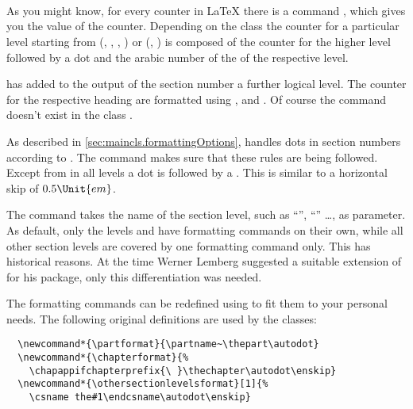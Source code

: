 \begin{Explain}%
\begin{Declaration}
  \\
  \\
  \\
\end{Declaration}%
%
%
%
%
  As you might know, for every counter in {\LaTeX} there is a command
  , which gives you the value of the
  counter. Depending on the class the counter for a particular level
  starting from  (, ,
  , ) or 
  (, ) is composed of the counter for the
  higher level followed by a dot and the arabic number of the
   of the respective level.\par
\end{Explain}

\KOMAScript{} has added to the output of the section number a further
logical level. The counter for the respective heading are formatted
using ,  and
.
Of course the command
 doesn't exist in the class .

As described in \autoref{sec:maincls.formattingOptions},
{\KOMAScript} handles dots in section numbers according to
\cite{DUDEN}. The command  makes sure that these rules
are being followed. Except from  in all levels a dot is
followed by a .  This is similar to a horizontal skip of
\(0.5\Unit{em}\).

The command  takes the name of the
section level, such as ``'', ``''
\dots{}, as parameter. As default, only the levels  and
 have formatting commands on their own, while all other
section levels are covered by one formatting command only. This has
historical reasons. At the time Werner Lemberg suggested a suitable
extension of {\KOMAScript} for his  package, only this
differentiation was needed.

The formatting commands can be redefined using  to
fit them to your personal needs. The following original definitions
are used by the {\KOMAScript} classes:
\begin{lstlisting}
  \newcommand*{\partformat}{\partname~\thepart\autodot}
  \newcommand*{\chapterformat}{%
    \chapappifchapterprefix{\ }\thechapter\autodot\enskip}
  \newcommand*{\othersectionlevelsformat}[1]{%
    \csname the#1\endcsname\autodot\enskip}
\end{lstlisting}


